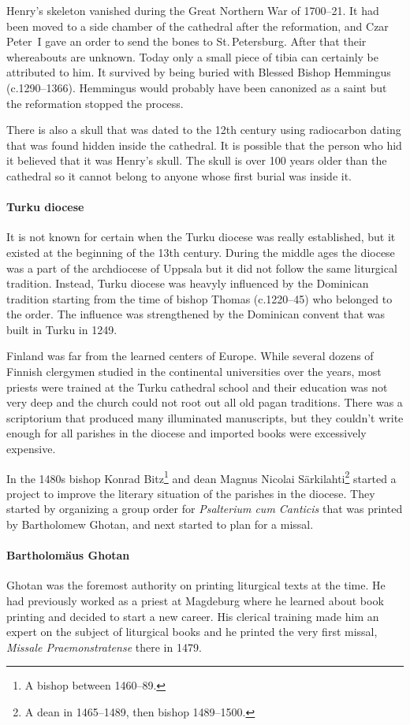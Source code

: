 \documentclass[a4paper, 12pt]{article}
\begin{document}
Henry's skeleton vanished during the Great Northern War of 1700–21. It
had been moved to a side chamber of the cathedral after the
reformation, and Czar Peter~I gave an order to send the bones to
St.\,Petersburg. After that their whereabouts are unknown. Today only
a small piece of tibia can certainly be attributed to him. It survived
by being buried with Blessed Bishop Hemmingus (c.1290–1366). Hemmingus
would probably have been canonized as a saint but the reformation
stopped the process.

There is also a skull that was dated to the 12th century using
radiocarbon dating that was found hidden inside the cathedral. It is
possible that the person who hid it believed that it was Henry's
skull. The skull is over 100 years older than the cathedral so it
cannot belong to anyone whose first burial was inside it.

\paragraph{Turku diocese} It is not known for certain when the Turku
diocese was really established, but it existed at the beginning of the
13th century. During the middle ages the diocese was a part of the
archdiocese of Uppsala but it did not follow the same liturgical
tradition. Instead, Turku diocese was heavyly influenced by the
Dominican tradition starting from the time of bishop Thomas
(c.1220–45) who belonged to the order. The influence was strengthened
by the Dominican convent that was built in Turku in 1249.

Finland was far from the learned centers of Europe. While several
dozens of Finnish clergymen studied in the continental universities
over the years, most priests were trained at the Turku cathedral
school and their education was not very deep and the church could not
root out all old pagan traditions. There was a scriptorium that
produced many illuminated manuscripts, but they couldn't write enough
for all parishes in the diocese and imported books were excessively
expensive.

In the 1480s bishop Konrad Bitz\footnote{A bishop between 1460–89.}
and dean Magnus Nicolai Särkilahti\footnote{A dean in 1465–1489, then
  bishop 1489–1500.} started a project to improve the literary
situation of the parishes in the diocese. They started by organizing a
group order for \emph{Psalterium cum Canticis} that was printed by
Bartholomew Ghotan, and next started to plan for a missal.


\paragraph{Bartholomäus Ghotan}
Ghotan was the foremost authority on printing liturgical texts at the
time. He had previously worked as a priest at Magdeburg where he
learned about book printing and decided to start a new career. His
clerical training made him an expert on the subject of liturgical
books and he printed the very first missal, \emph{Missale
  Praemonstratense} there in 1479. 
\end{document}
